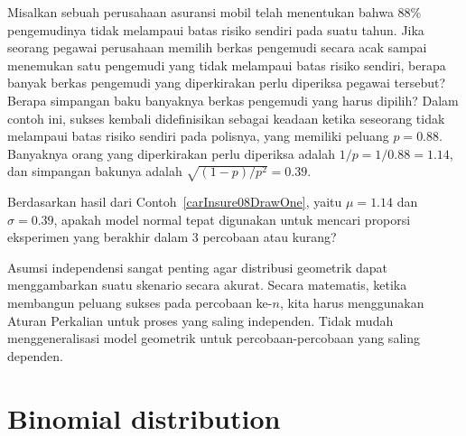 \D{\newpage}

\begin{examplewrap}
\begin{nexample}{Misalkan sebuah perusahaan asuransi mobil telah
    menentukan bahwa 88\% pengemudinya tidak melampaui batas risiko sendiri
    pada suatu tahun. Jika seorang pegawai perusahaan memilih berkas
    pengemudi secara acak sampai menemukan satu pengemudi yang tidak
    melampaui batas risiko sendiri, berapa banyak berkas pengemudi yang
    diperkirakan perlu diperiksa pegawai tersebut? Berapa simpangan baku
    banyaknya berkas pengemudi yang harus dipilih?}
  \label{carInsure08DrawOne}%
  Dalam contoh ini, sukses kembali didefinisikan sebagai keadaan ketika
  seseorang tidak melampaui batas risiko sendiri pada polisnya, yang memiliki
  peluang $p = 0.88$. Banyaknya orang yang diperkirakan perlu diperiksa
  adalah $1 / p = 1 / 0.88 = 1.14$, dan simpangan bakunya adalah
  $\sqrt{(1-p)/p^2} = 0.39$.
\end{nexample}
\end{examplewrap}

\begin{exercisewrap}
\begin{nexercise}
Berdasarkan hasil dari Contoh~\ref{carInsure08DrawOne}, yaitu
$\mu = 1.14$ dan $\sigma = 0.39$, apakah model normal tepat digunakan
untuk mencari proporsi eksperimen yang berakhir dalam 3 percobaan atau
kurang?\footnotemark{}
\end{nexercise}
\end{exercisewrap}

Asumsi independensi sangat penting agar distribusi geometrik dapat
menggambarkan suatu skenario secara akurat. Secara matematis, ketika
membangun peluang sukses pada percobaan ke-$n$, kita harus menggunakan
Aturan Perkalian untuk proses yang saling independen. Tidak mudah
menggeneralisasi model geometrik untuk percobaan-percobaan yang saling
dependen.



{}
\section{Binomial distribution}
\label{binomialModel}


